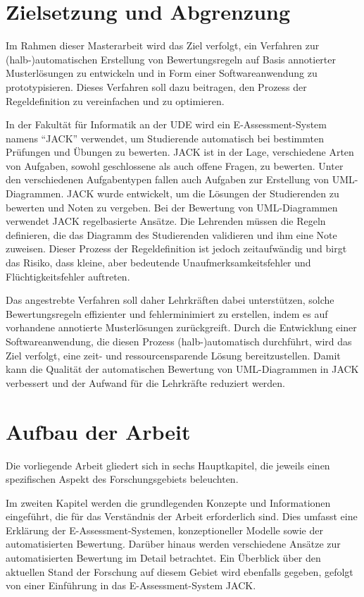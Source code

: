 \section{Zielsetzung und Abgrenzung}

Im Rahmen dieser Masterarbeit wird das Ziel verfolgt, ein Verfahren zur (halb-)automatischen Erstellung von Bewertungsregeln auf Basis annotierter Musterlösungen zu entwickeln und in Form einer Softwareanwendung zu prototypisieren. Dieses Verfahren soll dazu beitragen, den Prozess der Regeldefinition zu vereinfachen und zu optimieren.

In der Fakultät für Informatik an der \ac{UDE} wird ein E-Assessment-System namens ``\gls{JACK}'' \cite{jack}  verwendet, um Studierende automatisch bei bestimmten Prüfungen und Übungen zu bewerten. \gls{JACK} ist in der Lage, verschiedene Arten von Aufgaben, sowohl geschlossene als auch offene Fragen, zu bewerten. Unter den verschiedenen Aufgabentypen fallen auch Aufgaben zur Erstellung von \ac{UML}-Diagrammen. \gls{JACK} wurde entwickelt, um die Lösungen der Studierenden zu bewerten und Noten zu vergeben. Bei der Bewertung von \ac{UML}-Diagrammen verwendet \gls{JACK} regelbasierte Ansätze. Die Lehrenden müssen die Regeln definieren, die das Diagramm des Studierenden validieren und ihm eine Note zuweisen. Dieser Prozess der Regeldefinition ist jedoch zeitaufwändig und birgt das Risiko, dass kleine, aber bedeutende Unaufmerksamkeitsfehler und Flüchtigkeitsfehler auftreten.

Das angestrebte Verfahren soll daher Lehrkräften dabei unterstützen, solche Bewertungsregeln effizienter und fehlerminimiert zu erstellen, indem es auf vorhandene annotierte Musterlösungen zurückgreift. Durch die Entwicklung einer Softwareanwendung, die diesen Prozess (halb-)automatisch durchführt, wird das Ziel verfolgt, eine zeit- und ressourcensparende Lösung bereitzustellen. Damit kann die Qualität der automatischen Bewertung von UML-Diagrammen in \gls{JACK} verbessert und der Aufwand für die Lehrkräfte reduziert werden.

\section{Aufbau der Arbeit}

Die vorliegende Arbeit gliedert sich in sechs Hauptkapitel, die jeweils einen spezifischen Aspekt des Forschungsgebiets beleuchten.

Im zweiten Kapitel werden die grundlegenden Konzepte und Informationen eingeführt, die für das Verständnis der Arbeit erforderlich sind. Dies umfasst eine Erklärung der \gls{E-Assessment-Systemen}, konzeptioneller Modelle sowie der automatisierten Bewertung. Darüber hinaus werden verschiedene Ansätze zur automatisierten Bewertung im Detail betrachtet. Ein Überblick über den aktuellen Stand der Forschung auf diesem Gebiet wird ebenfalls gegeben, gefolgt von einer Einführung in das E-Assessment-System \gls{JACK}.

